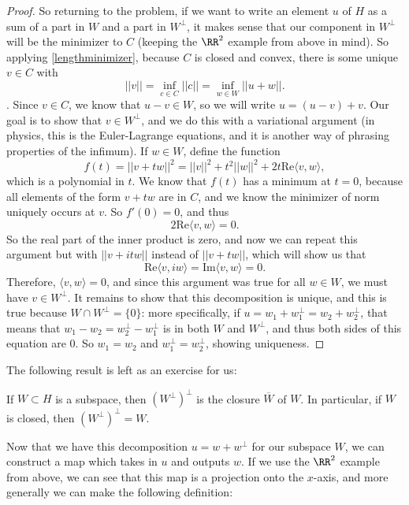 \begin{proof}
So returning to the problem, if we want to write an element $u$ of $H$ as a sum of a part in $W$ and a part in $W^\perp$, it makes sense that our component in $W^\perp$ will be the minimizer to $C$ (keeping the $\RR^2$ example from above in mind). So applying \cref{lengthminimizer}, because $C$ is closed and convex, there is some unique $v \in C$ with 
\[
    ||v|| = \inf_{c \in C} ||c|| = \inf_{w \in W} ||u + w||.
\].
Since $v \in C$, we know that $u - v \in W$, so we will write $u = (u-v) + v$. Our goal is to show that $v \in W^\perp$, and we do this with a variational argument (in physics, this is the Euler-Lagrange equations, and it is another way of phrasing properties of the infimum). If $w \in W$, define the function 
\[
    f(t) = ||v + tw||^2 = ||v||^2 + t^2 ||w||^2 + 2t \text{Re}\langle v, w \rangle,
\]
which is a polynomial in $t$. We know that $f(t)$ has a minimum at $t = 0$, because all elements of the form $v + tw$ are in $C$, and we know the minimizer of norm uniquely occurs at $v$. So $f'(0) = 0$, and thus
\[
    2 \text{Re}\langle v, w \rangle = 0.
\]
So the real part of the inner product is zero, and now we can repeat this argument but with $||v + itw||$ instead of $||v + tw||$, which will show us that 
\[
    \text{Re}\langle v, iw \rangle = \text{Im}\langle v, w \rangle = 0. 
\]
Therefore, $\langle v, w \rangle = 0$, and since this argument was true for all $w \in W$, we must have $v \in W^\perp$. It remains to show that this decomposition is unique, and this is true because $W \cap W^\perp = \{0\}$: more specifically, if $u = w_1 + w_1^\perp = w_2 + w_2^\perp$, that means that $w_1 - w_2 = w_2^\perp - w_1^\perp$ is in both $W$ and $W^\perp$, and thus both sides of this equation are $0$. So $w_1 = w_2$ and $w_1^\perp = w_2^\perp$, showing uniqueness.
\end{proof}

The following result is left as an exercise for us:

\begin{theorem}
If $W \subset H$ is a subspace, then $(W^\perp)^\perp$ is the closure $\overline{W}$ of $W$. In particular, if $W$ is closed, then $(W^\perp)^\perp = W$.
\end{theorem}

Now that we have this decomposition $u = w + w^\perp$ for our subspace $W$, we can construct a map which takes in $u$ and outputs $w$. If we use the $\RR^2$ example from above, we can see that this map is a projection onto the $x$-axis, and more generally we can make the following definition:

